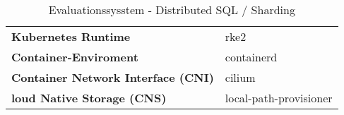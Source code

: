 \begin{table}[H]


\begin{tabular}{ll}
\toprule
\midrule
\textbf{Kubernetes Runtime} & rke2 \\
\textbf{Container-Enviroment} & containerd \\
\textbf{Container Network Interface (CNI)} & cilium \\
\textbf{loud Native Storage (CNS)} & local-path-provisioner \\
\bottomrule
\end{tabular}
\caption{Evaluationssysstem - Distributed SQL / Sharding} \label{evaluation_distributed_sql}
\end{table}
